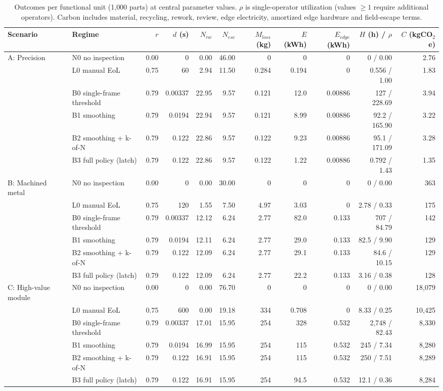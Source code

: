 \begin{table}[!t]
\centering
\scriptsize
\caption{Outcomes per functional unit (1{,}000 parts) at central parameter values. $\rho$ is single-operator utilization (values $\geq 1$ require additional operators). Carbon includes material, recycling, rework, review, edge electricity, amortized edge hardware and field-escape terms.}
\label{tab:regimes}
\setlength{\tabcolsep}{4pt}
\begin{tabular}{@{}llrrrrrrrrr@{}}
\toprule
Scenario & Regime & $r$ & $d$ (s) & $N_{rw}$ & $N_{esc}$ & $M_{loss}$ (kg) & $E$ (kWh) & $E_{edge}$ (kWh) & $H$ (h) / $\rho$ & $C$ (kgCO$_2$e) \\
\midrule
A: Precision & N0 no inspection & 0.00 & 0 & 0.00 & 46.00 & 0 & 0 & 0 & 0 / 0.00 & 2.76 \\
 & L0 manual EoL & 0.75 & 60 & 2.94 & 11.50 & 0.284 & 0.194 & 0 & 0.556 / 1.00 & 1.83 \\
 & B0 single-frame threshold & 0.79 & 0.00337 & 22.95 & 9.57 & 0.121 & 12.0 & 0.00886 & 127 / 228.69 & 3.94 \\
 & B1 smoothing & 0.79 & 0.0194 & 22.94 & 9.57 & 0.121 & 8.99 & 0.00886 & 92.2 / 165.90 & 3.22 \\
 & B2 smoothing + k-of-N & 0.79 & 0.122 & 22.86 & 9.57 & 0.122 & 9.23 & 0.00886 & 95.1 / 171.09 & 3.28 \\
 & B3 full policy (latch) & 0.79 & 0.122 & 22.86 & 9.57 & 0.122 & 1.22 & 0.00886 & 0.792 / 1.43 & 1.35 \\
\midrule
B: Machined metal & N0 no inspection & 0.00 & 0 & 0.00 & 30.00 & 0 & 0 & 0 & 0 / 0.00 & 363 \\
 & L0 manual EoL & 0.75 & 120 & 1.55 & 7.50 & 4.97 & 3.03 & 0 & 2.78 / 0.33 & 175 \\
 & B0 single-frame threshold & 0.79 & 0.00337 & 12.12 & 6.24 & 2.77 & 82.0 & 0.133 & 707 / 84.79 & 142 \\
 & B1 smoothing & 0.79 & 0.0194 & 12.11 & 6.24 & 2.77 & 29.0 & 0.133 & 82.5 / 9.90 & 129 \\
 & B2 smoothing + k-of-N & 0.79 & 0.122 & 12.09 & 6.24 & 2.77 & 29.1 & 0.133 & 84.6 / 10.15 & 129 \\
 & B3 full policy (latch) & 0.79 & 0.122 & 12.09 & 6.24 & 2.77 & 22.2 & 0.133 & 3.16 / 0.38 & 128 \\
\midrule
C: High-value module & N0 no inspection & 0.00 & 0 & 0.00 & 76.70 & 0 & 0 & 0 & 0 / 0.00 & 18{,}079 \\
 & L0 manual EoL & 0.75 & 600 & 0.00 & 19.18 & 334 & 0.708 & 0 & 8.33 / 0.25 & 10{,}425 \\
 & B0 single-frame threshold & 0.79 & 0.00337 & 17.01 & 15.95 & 254 & 328 & 0.532 & 2{,}748 / 82.43 & 8{,}330 \\
 & B1 smoothing & 0.79 & 0.0194 & 16.99 & 15.95 & 254 & 115 & 0.532 & 245 / 7.34 & 8{,}280 \\
 & B2 smoothing + k-of-N & 0.79 & 0.122 & 16.91 & 15.95 & 254 & 115 & 0.532 & 250 / 7.51 & 8{,}289 \\
 & B3 full policy (latch) & 0.79 & 0.122 & 16.91 & 15.95 & 254 & 94.5 & 0.532 & 12.1 / 0.36 & 8{,}284 \\
\bottomrule
\end{tabular}
\end{table}

